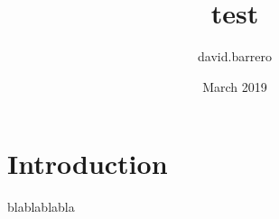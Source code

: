 \documentclass{article}
\title{test}
\author{david.barrero }
\date{March 2019}
\begin{document}
\maketitle

\section{Introduction}
blablablabla
\end{document}

